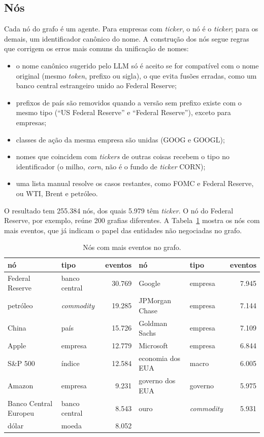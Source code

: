 \subsection{Nós}

Cada nó do grafo é um agente. Para empresas com \emph{ticker}, o nó é o \emph{ticker}; para os demais,
um identificador canônico do nome. A construção dos nós segue regras que corrigem os erros mais comuns
da unificação de nomes:
\begin{itemize}
  \item o nome canônico sugerido pelo LLM só é aceito se for compatível com o nome original (mesmo
        \emph{token}, prefixo ou sigla), o que evita fusões erradas, como um banco central estrangeiro
        unido ao Federal Reserve;
  \item prefixos de país são removidos quando a versão sem prefixo existe com o mesmo tipo (``US
        Federal Reserve'' e ``Federal Reserve''), exceto para empresas;
  \item classes de ação da mesma empresa são unidas (GOOG e GOOGL);
  \item nomes que coincidem com \emph{tickers} de outras coisas recebem o tipo no identificador (o milho,
        \emph{corn}, não é o fundo de \emph{ticker} CORN);
  \item uma lista manual resolve os casos restantes, como FOMC e Federal Reserve, ou WTI, Brent e
        petróleo.
\end{itemize}

O resultado tem 255.384 nós, dos quais 5.979 têm \emph{ticker}. O nó do Federal Reserve, por exemplo,
reúne 200 grafias diferentes. A Tabela~\ref{tab:nos} mostra os nós com mais eventos, que já indicam o
papel das entidades não negociadas no grafo.

\begin{table}[htbp]
\centering
\small
\caption{Nós com mais eventos no grafo.}
\label{tab:nos}
\begin{tabular}{llr@{\hspace{1.2em}}llr}
\toprule
nó & tipo & eventos & nó & tipo & eventos \\
\midrule
Federal Reserve & banco central & 30.769 & Google & empresa & 7.945 \\
petróleo & \emph{commodity} & 19.285 & JPMorgan Chase & empresa & 7.144 \\
China & país & 15.726 & Goldman Sachs & empresa & 7.109 \\
Apple & empresa & 12.779 & Microsoft & empresa & 6.844 \\
S\&P 500 & índice & 12.584 & economia dos EUA & macro & 6.005 \\
Amazon & empresa & 9.231 & governo dos EUA & governo & 5.975 \\
Banco Central Europeu & banco central & 8.543 & ouro & \emph{commodity} & 5.931 \\
dólar & moeda & 8.052 & & & \\
\bottomrule
\end{tabular}
\end{table}

